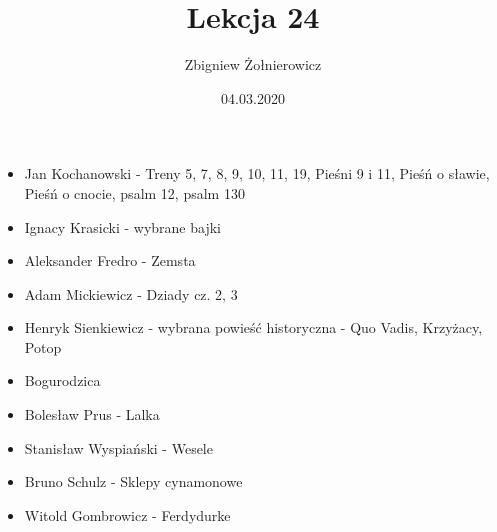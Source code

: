 \documentclass[a4paper]{article}
\begin{document}
\title{{\huge Lekcja 24} \\
{\large }}
\author{Zbigniew Żołnierowicz}
\date{04.03.2020}
\maketitle
\begin{itemize}
    \item Jan Kochanowski - Treny 5, 7, 8, 9, 10, 11, 19, Pieśni 9 i 11, Pieśń o sławie, Pieśń o cnocie, psalm 12, psalm 130
    \item Ignacy Krasicki - wybrane bajki
    \item Aleksander Fredro - Zemsta
    \item Adam Mickiewicz - Dziady cz. 2, 3
    \item Henryk Sienkiewicz - wybrana powieść historyczna - Quo Vadis, Krzyżacy, Potop
    \item Bogurodzica
    \item Bolesław Prus - Lalka
    \item Stanisław Wyspiański - Wesele
    \item Bruno Schulz - Sklepy cynamonowe
    \item Witold Gombrowicz - Ferdydurke
\end{itemize}
\end{document}
